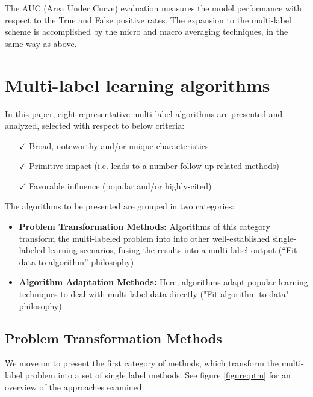 \documentclass[12pt]{report}
\begin{document}
\begin{itemize}
\begin{itemize}
\begin{itemize}
          The AUC (Area Under Curve) evaluation measures the model performance with respect
          to the True and False positive rates. The expansion to the multi-label
          scheme is accomplished by the micro and macro averaging techniques, in
          the same way as above.
			\end{itemize}
		\end{itemize} 
	\end{itemize}
	
	\section*{Multi-label learning algorithms}
	In this paper, eight representative multi-label algorithms are presented and analyzed, selected with respect to below criteria:
	\begin{itemize}
		\item[$\checkmark$] Broad, noteworthy and/or unique characteristics
		\item[$\checkmark$] Primitive impact (i.e. leads to a number follow-up related methods)
		\item[$\checkmark$] Favorable influence (popular and/or highly-cited) 
	\end{itemize}
	
	The algorithms to be presented are grouped in two categories:
	\begin{itemize}
		\item \textbf{Problem Transformation Methods: }Algorithms of this category
      transform the multi-labeled problem into into other well-established
      single-labeled learning scenarios, fusing the results into a multi-label output (``Fit data to algorithm'' philosophy)
		\item \textbf{Algorithm Adaptation Methods: }Here, algorithms adapt popular learning techniques to deal with multi-label data directly ("Fit algorithm to data" philosophy)
	\end{itemize}

	\subsection*{Problem Transformation Methods}
  We move on to present the first category of methods, which transform the
  multi-label problem into a set of single label methods. See figure \ref{figure:ptm} for an overview of the approaches examined.
\end{document}
